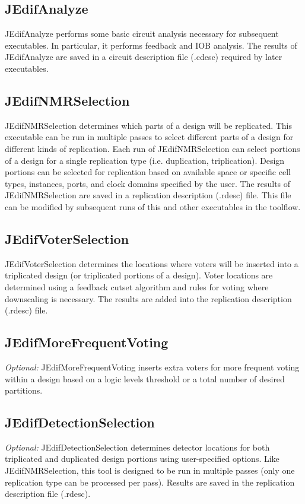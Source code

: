 \documentclass[english]{article}
\numberwithin{figure}{section}
\begin{document}
\subsection{JEdifAnalyze}
JEdifAnalyze performs some basic circuit analysis necessary for
subsequent executables. In particular, it performs feedback and IOB
analysis. The results of JEdifAnalyze are saved in a circuit
description file (.cdesc) required by later executables.

\subsection{JEdifNMRSelection}
JEdifNMRSelection determines which parts of a design will be
replicated. This executable can be run in multiple passes to select
different parts of a design for different kinds of replication. Each
run of JEdifNMRSelection can select portions of a design for a single
replication type (i.e. duplication, triplication). Design portions can
be selected for replication based on available space or specific cell
types, instances, ports, and clock domains specified by the user. The
results of JEdifNMRSelection are saved in a replication description
(.rdesc) file. This file can be modified by subsequent runs of this
and other executables in the toolflow.

\subsection{JEdifVoterSelection}
JEdifVoterSelection determines the locations where voters will be
inserted into a triplicated design (or triplicated portions of a
design). Voter locations are determined using a feedback cutset
algorithm and rules for voting where downscaling is necessary. The
results are added into the replication description (.rdesc) file.

\subsection{JEdifMoreFrequentVoting}
\emph{Optional:} JEdifMoreFrequentVoting inserts extra voters for more frequent voting within a design based on a logic levels threshold or a total number of desired
partitions.

\subsection{JEdifDetectionSelection}
\emph{Optional:}
JEdifDetectionSelection determines detector locations for both triplicated and
duplicated design portions using user-specified options. Like
JEdifNMRSelection, this tool is designed to be run in multiple passes
(only one replication type can be processed per pass). Results are
saved in the replication description file (.rdesc).
\end{document}
